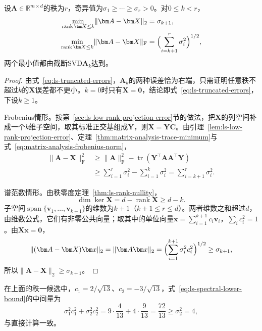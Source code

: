 \begin{theorem}
\label{thm:ls-best-low-rank}
\label{thm:matrix-analysis-best-low-rank}
设$\bm A\in\mathbb R^{m\times d}$的秩为$r$，奇异值为$\sigma_1\geq\cdots\geq\sigma_r>0$。对$0\leq k<r$，
\begin{align}
 \min_{\operatorname{rank}\bm X\leq k}\lVert\bm A-\bm X\rVert_2
 &=\sigma_{k+1},
 \label{eq:matrix-analysis-best-rank-k-spectral}\\
 \min_{\operatorname{rank}\bm X\leq k}\lVert\bm A-\bm X\rVert_{\mathrm F}
 &=\Bigl(\sum_{i=k+1}^r\sigma_i^2\Bigr)^{1/2},
 \label{eq:matrix-analysis-best-rank-k-frobenius}
\end{align}
两个最小值都由截断SVD$\bm A_k$达到。
\end{theorem}
\begin{proof}
由式~\eqref{eq:ls-truncated-errors}，$\bm A_k$的两种误差恰为右端，只需证明任意秩不超过$k$的$\bm X$误差都不更小。$k=0$时只有$\bm X=\bm0$，结论即式~\eqref{eq:ls-truncated-errors}，下设$k\geq1$。

Frobenius情形。按第~\ref{sec:ls-low-rank-projection-error}节的做法，把$\bm X$的列空间补成一个$k$维子空间，取其标准正交基组成$\bm Y$，则$\bm X=\bm Y\bm C$。由引理~\ref{lem:ls-low-rank-projection-error}、定理~\ref{thm:matrix-analysis-trace-minimum}与式~\eqref{eq:matrix-analysis-frobenius-norm}，
\[
 \begin{aligned}
 \lVert\bm A-\bm X\rVert_{\mathrm F}^2
 &\geq\lVert\bm A\rVert_{\mathrm F}^2-\operatorname{tr}(\bm Y^\top\bm A\bm A^\top\bm Y)\\
 &\geq\sum_{i=1}^r\sigma_i^2-\sum_{i=1}^k\sigma_i^2=\sum_{i=k+1}^r\sigma_i^2 .
 \end{aligned}
\]

谱范数情形。由秩零度定理~\ref{thm:ls-rank-nullity}，
\[
 \dim\ker\bm X=d-\operatorname{rank}\bm X\geq d-k .
\]
子空间$\operatorname{span}\{\bm v_1,\ldots,\bm v_{k+1}\}$的维数为$k+1$（$k+1\leq r\leq d$）。两者维数之和超过$d$，由维数公式，它们有非零公共向量；取其中的单位向量$\bm x=\sum_{i=1}^{k+1}c_i\bm v_i$，$\sum_ic_i^2=1$。由$\bm X\bm x=\bm0$，
\begin{equation}
 \lVert(\bm A-\bm X)\bm x\rVert_2
 =\lVert\bm A\bm x\rVert_2
 =\Bigl(\sum_{i=1}^{k+1}\sigma_i^2c_i^2\Bigr)^{1/2}
 \geq\sigma_{k+1},
 \label{eq:ls-spectral-lower-bound}
\end{equation}
所以$\lVert\bm A-\bm X\rVert_2\geq\sigma_{k+1}$。
\end{proof}

在上面的秩一候选中，$c_1=2/\sqrt{13}$、$c_2=-3/\sqrt{13}$，式~\eqref{eq:ls-spectral-lower-bound}的中间量为
\[
 \sigma_1^2c_1^2+\sigma_2^2c_2^2=9\cdot\frac4{13}+4\cdot\frac9{13}=\frac{72}{13}\geq\sigma_2^2=4 ,
\]
与直接计算一致。

